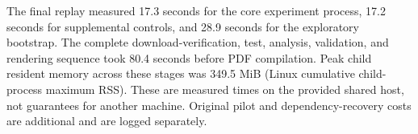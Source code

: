 The final replay measured 17.3 seconds for the core experiment process, 17.2 seconds for supplemental controls, and 28.9 seconds for the exploratory bootstrap. The complete download-verification, test, analysis, validation, and rendering sequence took 80.4 seconds before PDF compilation. Peak child resident memory across these stages was 349.5 MiB (Linux cumulative child-process maximum RSS). These are measured times on the provided shared host, not guarantees for another machine. Original pilot and dependency-recovery costs are additional and are logged separately.
